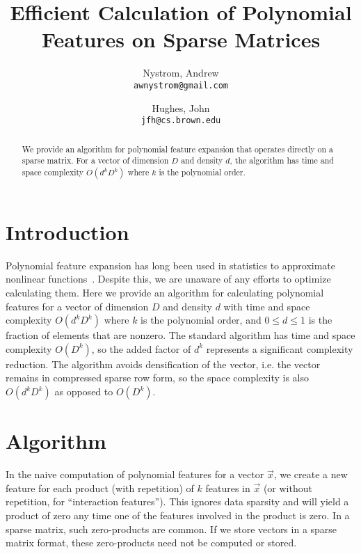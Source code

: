 \documentclass{article} %
\title{Efficient Calculation of Polynomial Features on Sparse Matrices}
\author{
  Nystrom, Andrew\\
  \texttt{awnystrom@gmail.com}
  \and
  Hughes, John\\
  \texttt{jfh@cs.brown.edu}
}
\begin{document}
\maketitle

\begin{abstract}
We provide an algorithm for polynomial feature expansion that operates directly on a sparse matrix.
For a vector of dimension $D$ and density $d$, the algorithm has time and space complexity $O(d^kD^k)$ where $k$ is the polynomial order.
\end{abstract}


\section{Introduction}

Polynomial feature expansion has long been used in statistics to approximate nonlinear functions~\cite{gergonne1974application, smith1918standard}.
Despite this, we are unaware of any efforts to optimize calculating them.
Here we provide an algorithm for calculating polynomial features for a vector of dimension $D$ and density $d$ with time and space complexity $O(d^kD^k)$ where $k$ is the polynomial order, and $0 \le d \le 1$ is the fraction of elements that are nonzero.
The standard algorithm has time and space complexity $O(D^k)$, so the added factor of $d^k$ represents a significant complexity reduction.
The algorithm avoids densification of the vector, i.e. the vector remains in compressed sparse row form, so the space complexity is also $O(d^kD^k)$ as opposed to $O(D^k)$. 

\section{Algorithm}
In the naive computation of polynomial features for a vector $\vec{x}$, we create a new feature for each product (with repetition) of $k$ features in $\vec{x}$ (or without repetition, for ``interaction features'').
This ignores data sparsity and will yield a product of zero any time one of the features involved in the product is zero.
In a sparse matrix, such zero-products are common.
If we store vectors in a sparse matrix format, these zero-products need not be computed or stored. 
\end{document}
